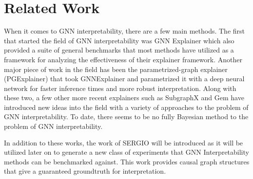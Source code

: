 \section{Related Work}
\label{sec:related}
When it comes to GNN interpretability, there are a few main methods. The first that started the field of GNN interpretability was GNN Explainer \cite{ying_gnnexplainer_2019} which also provided a suite of general benchmarks that most methods have utilized as a framework for analyzing the effectiveness of their explainer framework. Another major piece of work in the field has been the parametrized-graph explainer (PGExplainer) \cite{luo_parameterized_2020} that took GNNExplainer and parametrized it with a deep neural network for faster inference times and more robust interpretation. Along with these two, a few other more recent explainers such as SubgraphX \cite{yuan_explainability_2021} and Gem \cite{lin_generative_2021} have introduced new ideas into the field with a variety of approaches to the problem of GNN interpretability. To date, there seems to be no fully Bayesian method to the problem of GNN interpretability.

In addition to these works, the work of SERGIO \cite{dibaeinia_sergio_2020} will be introduced as it will be utilized later on to generate a new class of experiments that GNN Interpretability methods can be benchmarked against. This work provides causal graph structures that give a guaranteed groundtruth for interpretation.

